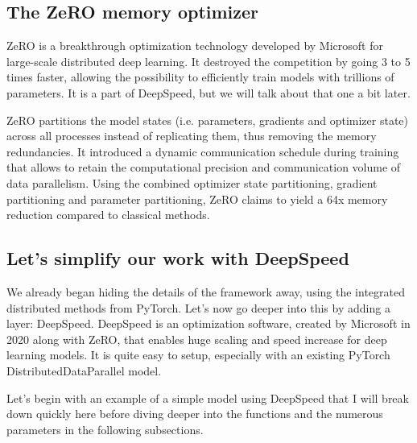 \documentclass{article}
\begin{document}
\subsection{The ZeRO memory optimizer}
ZeRO is a breakthrough optimization technology developed by Microsoft for large-scale distributed deep learning. It destroyed the competition by going 3 to 5 times faster, allowing the possibility to efficiently train models with trillions of parameters. It is a part of DeepSpeed, but we will talk about that one a bit later.

ZeRO partitions the model states (i.e. parameters, gradients and optimizer state) across all processes instead of replicating them, thus removing the memory redundancies. It introduced a dynamic communication schedule during training that allows to retain the computational precision and communication volume of data parallelism. Using the combined optimizer state partitioning, gradient partitioning and parameter partitioning, ZeRO claims to yield a 64x memory reduction compared to classical methods.

\subsection{Let's simplify our work with DeepSpeed}
We already began hiding the details of the framework away, using the integrated distributed methods from PyTorch. Let's now go deeper into this by adding a layer: DeepSpeed. DeepSpeed is an optimization software, created by Microsoft in 2020 along with ZeRO, that enables huge scaling and speed increase for deep learning models. It is quite easy to setup, especially with an existing PyTorch DistributedDataParallel model.

Let's begin with an example of a simple model using DeepSpeed that I will break down quickly here before diving deeper into the functions and the numerous parameters in the following subsections.
\end{document}
